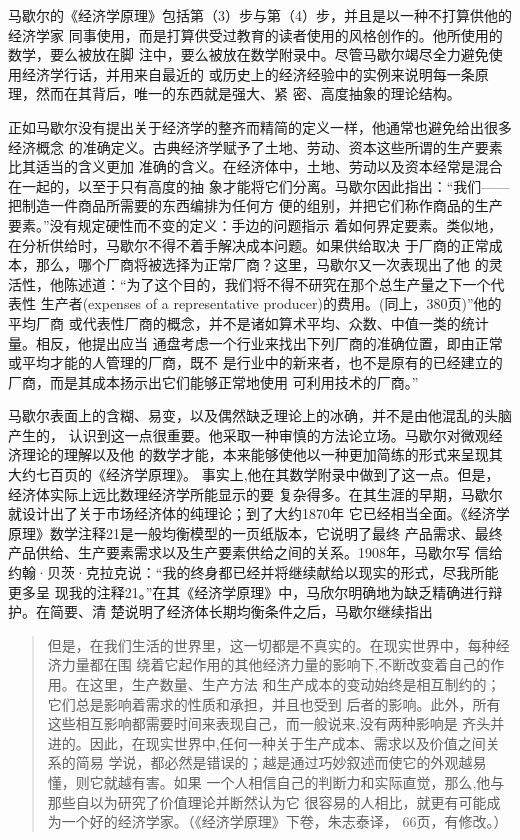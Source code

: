 马歇尔的《经济学原理》包括第（3）步与第（4）步，并且是以一种不打算供他的经济学家
同事使用，而是打算供受过教育的读者使用的风格创作的。他所使用的数学，要么被放在脚
注中，要么被放在数学附录中。尽管马歇尔竭尽全力避免使用经济学行话，并用来自最近的
或历史上的经济经验中的实例来说明每一条原理，然而在其背后，唯一的东西就是强大、紧
密、高度抽象的理论结构。

正如马歇尔没有提出关于经济学的整齐而精简的定义一样，他通常也避免给出很多经济概念
的准确定义。古典经济学赋予了土地、劳动、资本这些所谓的生产要素比其适当的含义更加
准确的含义。在经济体中，土地、劳动以及资本经常是混合在一起的，以至于只有高度的抽
象才能将它们分离。马歇尔因此指出：“我们——把制造一件商品所需要的东西编排为任何方
便的组别，并把它们称作商品的生产要素。”没有规定硬性而不变的定义：手边的问题指示
着如何界定要素。类似地，在分析供给时，马歇尔不得不着手解决成本问题。如果供给取决
于厂商的正常成本，那么，哪个厂商将被选择为正常厂商？这里，马歇尔又一次表现出了他
的灵活性，他陈述道：“为了这个目的，我们将不得不研究在那个总生产量之下一个代表性
生产者(expenses of a representative producer)的费用。(同上，380页)”他的平均厂商
或代表性厂商的概念，并不是诸如算术平均、众数、中值一类的统计量。相反，他提出应当
通盘考虑一个行业来找出下列厂商的准确位置，即由正常或平均才能的人管理的厂商，既不
是行业中的新来者，也不是原有的已经建立的厂商，而是其成本扬示出它们能够正常地使用
可利用技术的厂商。”

马歇尔表面上的含糊、易变，以及偶然缺乏理论上的冰确，并不是由他混乱的头脑产生的，
认识到这一点很重要。他采取一种审慎的方法论立场。马歇尔对微观经济理论的理解以及他
的数学才能，本来能够使他以一种更加简练的形式来呈现其大约七百页的《经济学原理》。
事实上,他在其数学附录中做到了这一点。但是，经济体实际上远比数理经济学所能显示的要
复杂得多。在其生涯的早期，马歇尔就设计出了关于市场经济体的纯理论；到了大约1870年
它已经相当全面。《经济学原理》数学注释21是一般均衡模型的一页纸版本，它说明了最终
产品需求、最终产品供给、生产要素需求以及生产要素供给之间的关系。1908年，马歇尔写
信给约翰·贝茨·克拉克说：“我的终身都已经并将继续献给以现实的形式，尽我所能更多呈
现我的注释21。”在其《经济学原理》中，马欣尔明确地为缺乏精确进行辩护。在简要、清
楚说明了经济体长期均衡条件之后，马歇尔继续指出

\begin{quotation}
  但是，在我们生活的世界里，这一切都是不真实的。在现实世界中，每种经济力量都在围
  绕着它起作用的其他经济力量的影响下,不断改变着自己的作用。在这里，生产数量、生产方法
  和生产成本的变动始终是相互制约的；它们总是影响着需求的性质和承担，并且也受到
  后者的影响。此外，所有这些相互影响都需要时间来表现自己，而一般说来,没有两种影响是
  齐头并进的。因此，在现实世界中,任何一种关于生产成本、需求以及价值之间关系的简易
  学说，都必然是错误的；越是通过巧妙叙述而使它的外观越易懂，则它就越有害。如果
  一个人相信自己的判断力和实际直觉，那么,他与那些自以为研究了价值理论并断然认为它
  很容易的人相比，就更有可能成为一个好的经济学家。（《经济学原理》下卷，朱志泰译，
  66页，有修改。）
\end{quotation}

